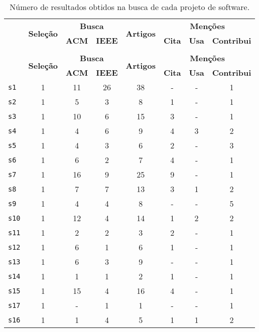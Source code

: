 \begin{longtable}{ l c c c c c c c }
\caption{Número de resultados obtidos na busca de cada projeto de software.}
\label{references-table} \\
  \hline
  \hhline{ l c c c c c c c |}
  \endfirsthead
  \hhline{ l c c c c c c c |}
  \hline
   \multirow{2}{*}{\textbf{ID}} & \multirow{2}{*}{\textbf{Seleção}} & \multicolumn{2}{c}{{\bf Busca}} & \multirow{2}{*}{\textbf{Artigos}} & \multicolumn{3}{c}{{\bf Menções}} \\
   & & \textbf{ACM} & \textbf{IEEE} & & \textbf{Cita} & \textbf{Usa} & \textbf{Contribui} \\
  \hline
  \hhline{ l c c c c c c c |}
  \endhead
  \hhline{--------}
  \multicolumn{8}{c}{continua na próxima página} \\
  \hhline{--------} \endfoot
  \hhline{--------} \endlastfoot
   \multirow{2}{*}{\textbf{ID}} & \multirow{2}{*}{\textbf{Seleção}} & \multicolumn{2}{c}{{\bf Busca}} & \multirow{2}{*}{\textbf{Artigos}} & \multicolumn{3}{c}{{\bf Menções}} \\
   & & \textbf{ACM} & \textbf{IEEE} & & \textbf{Cita} & \textbf{Usa} & \textbf{Contribui} \\
  \hline
\texttt{s1} & 1 & 11 & 26 & 38 & - & - & 1 \\
\texttt{s2} & 1 & 5 & 3 & 8 & 1 & - & 1 \\
\texttt{s3} & 1 & 10 & 6 & 15 & 3 & - & 1 \\
\texttt{s4} & 1 & 4 & 6 & 9 & 4 & 3 & 2 \\
\texttt{s5} & 1 & 4 & 3 & 6 & 2 & - & 3 \\
\texttt{s6} & 1 & 6 & 2 & 7 & 4 & - & 1 \\
\texttt{s7} & 1 & 16 & 9 & 25 & 9 & - & 1 \\
\texttt{s8} & 1 & 7 & 7 & 13 & 3 & 1 & 2 \\
\texttt{s9} & 1 & 4 & 4 & 8 & - & - & 5 \\
\texttt{s10} & 1 & 12 & 4 & 14 & 1 & 2 & 2 \\
\texttt{s11} & 1 & 2 & 2 & 3 & 2 & - & 1 \\
\texttt{s12} & 1 & 6 & 1 & 6 & 1 & - & 1 \\
\texttt{s13} & 1 & 6 & 3 & 9 & - & - & 1 \\
\texttt{s14} & 1 & 1 & 1 & 2 & 1 & - & 1 \\
\texttt{s15} & 1 & 15 & 4 & 16 & 4 & - & 1 \\
\texttt{s17} & 1 & - & 1 & 1 & - & - & 1 \\
\texttt{s16} & 1 & 1 & 4 & 5 & 1 & 1 & 2 \\

\end{longtable}
